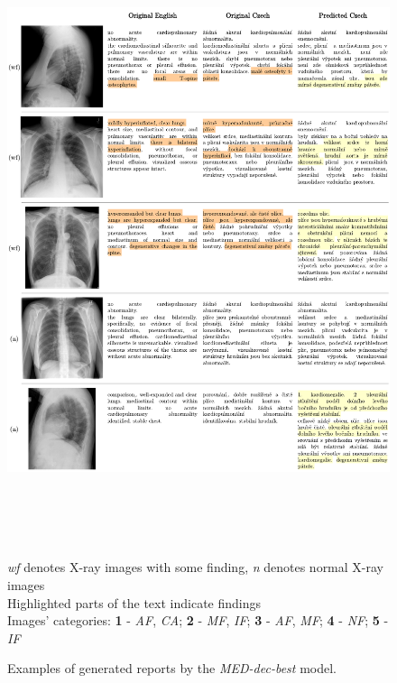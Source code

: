 \begin{figure}[h]\centering
\includegraphics[width=145mm, height=177.5mm]{../img/Examples2}
\caption{Examples of generated reports by the \textit{MED-dec-best} model.}
\label{fig02:Examples2}
\textit{wf} denotes X-ray images with some finding, \textit{n} denotes normal X-ray images\\
Highlighted parts of the text indicate findings\\
Images' categories:
\textbf{1} - \textit{AF}, \textit{CA};
\textbf{2} - \textit{MF}, \textit{IF};
\textbf{3} - \textit{AF}, \textit{MF};
\textbf{4} - \textit{NF};
\textbf{5} - \textit{IF}
\end{figure}

\newpage
